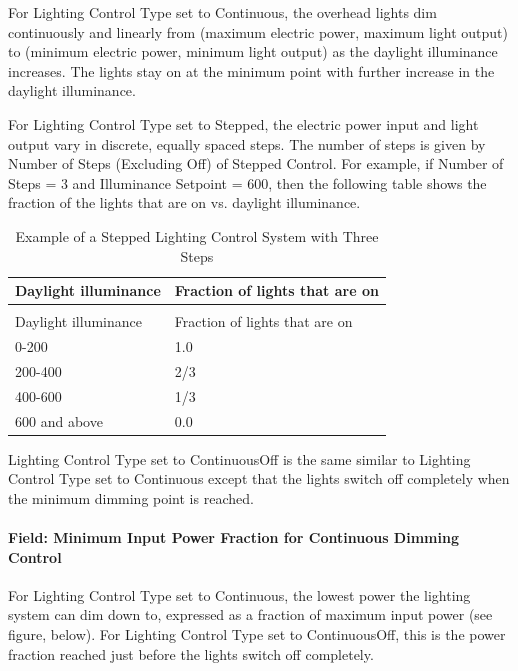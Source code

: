 For Lighting Control Type set to Continuous, the overhead lights dim continuously and linearly from (maximum electric power, maximum light output) to (minimum electric power, minimum light output) as the daylight illuminance increases. The lights stay on at the minimum point with further increase in the daylight illuminance.

For Lighting Control Type set to Stepped, the electric power input and light output vary in discrete, equally spaced steps. The number of steps is given by Number of Steps (Excluding Off) of Stepped Control. For example, if Number of Steps = 3 and Illuminance Setpoint = 600, then the following table shows the fraction of the lights that are on vs. daylight illuminance.

\begin{longtable}[c]{@{}ll@{}}
\caption{Example of a Stepped Lighting Control System with Three Steps \label{table:stepped-lighting-control-example}} \tabularnewline
\toprule
Daylight illuminance & Fraction of lights that are on \tabularnewline
\midrule
\endfirsthead

\caption[]{Example of a Stepped Lighting Control System with Three Steps} \tabularnewline
\toprule
Daylight illuminance & Fraction of lights that are on \tabularnewline
\midrule
\endhead

0-200 & 1.0 \tabularnewline
200-400 & 2/3 \tabularnewline
400-600 & 1/3 \tabularnewline
600 and above & 0.0 \tabularnewline
\bottomrule
\end{longtable}

Lighting Control Type set to ContinuousOff is the same similar to Lighting Control Type set to Continuous except that the lights switch off completely when the minimum dimming point is reached.

\paragraph{Field: Minimum Input Power Fraction for Continuous Dimming Control}\label{field-minimum-input-power-fraction-for-continuous-dimming-control}

For Lighting Control Type set to Continuous, the lowest power the lighting system can dim down to, expressed as a fraction of maximum input power (see figure, below). For Lighting Control Type set to ContinuousOff, this is the power fraction reached just before the lights switch off completely.

